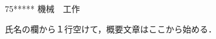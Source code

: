 \documentclass[12pt,a4j,fleqn]{jsarticle}
\begin{document}
\begin{center}
\textsf{}
\end{center}
\vspace{\baselineskip}
\begin{flushleft}
[○○研究室]
\end{flushleft}
\vspace{-2\baselineskip}
\begin{flushright}
75***** 機械　工作
\end{flushright}

氏名の欄から１行空けて，概要文章はここから始める．
\end{document}
